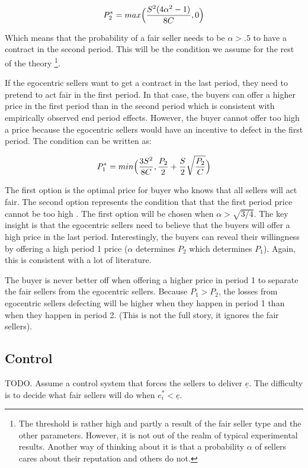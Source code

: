 \documentclass{article}
\begin{document}
$$
P^*_2 = max \Bigl( \frac{S^2 (4\alpha^2 - 1)}{8C}, 0 \Bigr )
$$

Which means that the probability of a fair seller needs to be $\alpha > .5$ to have a contract in the second period. This will be the condition we assume for the rest of the theory \footnote{The threshold is rather high and partly a result of the fair seller type and the other parameters. However, it is not out of the realm of typical experimental results. Another way of thinking about it is that a probability $\alpha$ of sellers cares about their reputation and others do not.}.

If the egocentric sellers want to get a contract in the last period, they need to pretend to act fair in the first period. In that case, the buyers can offer a higher price in the first period than in the second period which is consistent with empirically observed end period effects. However, the buyer cannot offer too high a price because the egocentric sellers would have an incentive to defect in the first period. The condition can be written as:

$$
P^*_1 = min \Bigl ( \frac{3 S^2}{8C},
           \frac{P_2}{2} + \frac{S}{2} \sqrt{\frac{P_2}{C}} \Bigr )
$$

The first option is the optimal price for buyer who knows that all sellers will act fair. The second option represents the condition that that the first period price cannot be too high . The first option will be chosen when $\alpha > \sqrt{3/4}$. The key insight is that the egocentric sellers need to believe that the buyers will offer a high price in the last period. Interestingly, the buyers can reveal their willingness by offering a high period 1 price ($\alpha$ determines $P_2$ which determines $P_1$). Again, this is consistent with a lot of literature. 

The buyer is never better off when offering a higher price in period 1 to separate the fair sellers from the egocentric sellers. Because $P_1 > P_2$, the losses from egocentric sellers defecting will be higher when they happen in period 1 than when they happen in period 2. (This is not the full story, it ignores the fair sellers).

\subsection{Control}

TODO. Assume a control system that forces the sellers to deliver $\underline{e}$. The difficulty is to decide what fair sellers will do when $e^*_i < \underline{e}$. 
\end{document}

